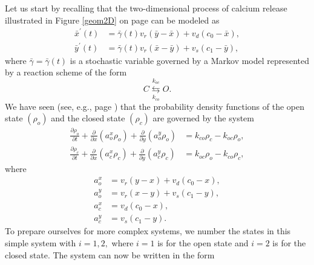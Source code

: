 Let us start by recalling that the two-dimensional process of calcium release
illustrated in Figure \ref{geom2D} on page \pageref{geom2D} can be modeled as
\begin{align}
\bar{x}^{\prime}(t)  &  =\bar{\gamma}(t)v_{r}\left(  \bar{y}-\bar{x}\right)
+v_{d}\left(  c_{0}-\bar{x}\right)  ,\label{c1g}\\
\bar{y}^{\prime}(t)  &  =\bar{\gamma}(t)v_{r}\left(  \bar{x}-\bar{y}\right)
+v_{s}\left(  c_{1}-\bar{y}\right)  , \label{c2g}
\end{align}
where $\bar{\gamma}=\bar{\gamma}(t)$ is a stochastic variable governed by a
Markov model represented by a reaction scheme of the form
\[
C\underset{k_{co}}{\overset{k_{oc}}{\leftrightarrows}}O.
\]
We have seen (see, e.g., page \pageref{eq:pdf21}) that the probability density
functions of the open state $(\rho_{o})$ and the closed state $(\rho_{c})$ are
governed by the system
\begin{align}
\frac{\partial\rho_{o}}{\partial t}+\frac{\partial}{\partial x}\left(
a_{o}^{x}\rho_{o}\right)  +\frac{\partial}{\partial y}\left(  a_{o}^{y}
\rho_{o}\right)   &  =k_{co}\rho_{c}-k_{oc}\rho_{o},\label{eq:pdf21g}\\
\frac{\partial\rho_{c}}{\partial t}+\frac{\partial}{\partial x}\left(
a_{c}^{x}\rho_{c}\right)  +\frac{\partial}{\partial y}\left(  a_{c}^{y}
\rho_{c}\right)   &  =k_{oc}\rho_{o}-k_{co}\rho_{c}, \label{eq:pdf22g}
\end{align}
where
\begin{align}
a_{o}^{x}  &  =v_{r}\left(  y-x\right)  +v_{d}\left(  c_{0}-x\right)
,\nonumber\\
a_{o}^{y}  &  =v_{r}\left(  x-y\right)  +v_{s}\left(  c_{1}-y\right)
,\label{eq:fluxes2Dg}\\
a_{c}^{x}  &  =v_{d}\left(  c_{0}-x\right)  ,\nonumber\\
a_{c}^{y}  &  =v_{s}\left(  c_{1}-y\right)  .\nonumber
\end{align}
To prepare ourselves for more complex systems, we number the states
in this simple system with $i=1,2,$ where $i=1$ is for the open state and $i=2$ is for the closed state. The
system can now be written in the form

